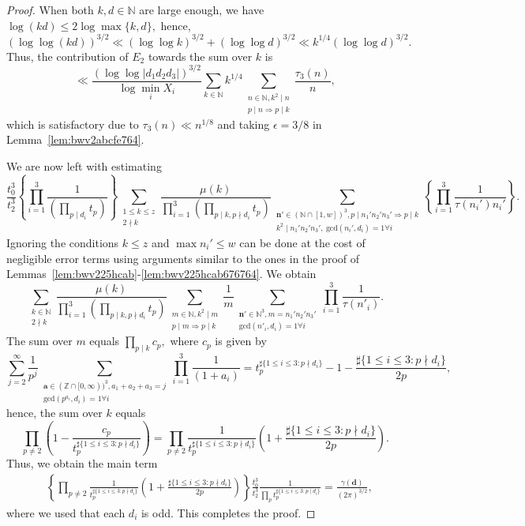 \documentclass[a4paper,12pt,reqno]{amsart}
\numberwithin{equation}{section} \numberwithin{figure}{section}
\newcommand\Z{\mathbb{Z}}
\newcommand\N{\mathbb{N}}
\renewcommand{\l}{\left}
\renewcommand{\r}{\right}
\renewcommand{\b}{\mathbf}
\renewcommand{\gcd}{\textrm{gcd}}
\renewcommand{\leq}{\leqslant}
\renewcommand{\#}{\sharp}
\theoremstyle{definition}
\numberwithin{lemma}{section}
\begin{document}
\begin{proof}
When both $k,d\in \N$ are 
 large enough,
we have  $ \log (k d) \leq 2\log \max\{k, d\},$ hence, $$(\log \log (k d) )^{3/2} \ll
(\log \log k)^{3/2}+(\log \log d)^{3/2}
\ll k^{1/4}
(\log \log d)^{3/2}
 .$$ Thus, 
the contribution of $E_2$ 
  towards the sum over $k$ is 
\[\ll 
\frac{(\log \log |d_1d_2d_3| )^{3/2} }{\log  \min_i X_i}
 \sum_{k\in \N }
k^{1/4} 
\sum_{\substack{ n\in \N, k^2 \mid n \\  p\mid n \Rightarrow p\mid k  }} \frac{\tau_3(n)   }{n} 
 ,\] which is satisfactory due to 
 $\tau_3(n) \ll n ^{1/8} $ and taking $\epsilon=3/8$ in 
Lemma~\ref{lem:bwv2abcfe764}. 



We are now  left with estimating
 \[ 
\frac{t_0^3}{t_2^3}
\l\{ \prod_{i=1}^3 
\frac{1}{ 
(\prod_{p\mid  d_i  } t_p)
 } \r\}\sum_{\substack{ 1\leq k \leq z  \\2\nmid k } }  
\frac{ \mu(k) 
 }{\prod_{i=1}^3\l(\prod_{p\mid k,p\nmid d_i}t_p\r)} 
\sum_{\substack{ \b n' \in (\N\cap[1,w])^3, p\mid n_1'n_2'n_3' \Rightarrow p\mid k \\
k^2\mid n_1'n_2'n_3' ,\ 
\gcd(n_i',d_i )=1 \forall i } } 
 \l\{\prod_{i=1}^3
\frac{1 }{ \tau( n_i') n_i'}  
\r\}
.\]
Ignoring the conditions $k\leq z $ and $\max n_i'\leq w $ can be done 
at the cost of negligible error terms using arguments similar to the ones 
in the proof of Lemmas~\ref{lem:bwv225hcab}-\ref{lem:bwv225hcab676764}.
We obtain  \[  \sum_{\substack{ k\in \N \\2\nmid k  }} 
\frac{\mu(k)}{\prod_{i=1}^3 \l( \prod_{p\mid k, p\nmid d_i }t_p\r) }
 \sum_{\substack{ m  \in \N , k^2\mid m    \\  p\mid m \Rightarrow p\mid k   } }
 \frac{1}{m } 
\sum_{\substack{ \b n' \in \N^3,  m=n_1'n_2'n_3' \\ \gcd(n'_i ,d_i )=1 \forall i
   } }   \prod_{i=1}^3    \frac{1 }{ \tau(n'_i)}.\]   
The   sum over $m$ equals $\prod_{p\mid k } c_p ,$ where $c_p$ is given by 
\[
 \sum_{j=2}^\infty \frac{1}{p^j } 
\sum_{\substack{
\b a \in (\Z\cap [0,\infty) )^3  , a_1+a_2+a_3=j
\\\gcd(p^{a_i}, d_i)=1  \forall i }
}   \prod_{i=1}^3 \frac{1}{(1+a_i) }
=
t_p^{\#\{1\leq i \leq 3: p\nmid d_i \}}
-1-\frac{\#\{1\leq i \leq 3: p\nmid d_i \}}{2p}
,\]  hence, the sum over $k$ equals $$ \prod_{p\neq 2  } \l(1-\frac{c_p}{t_p^{\#\{1\leq i \leq 3: p\nmid d_i \}}} \r)=
 \prod_{p\neq 2  } 
 \frac{1}{t_p^{\#\{1\leq i \leq 3: p\nmid d_i \}}}  
\l(1+  \frac{\#\{1\leq i  \leq 3 : p\nmid d_i \}}{2 p} \r). $$
Thus, we obtain  the main term 
\begin{align*}
&
\l\{ \prod_{p\neq 2  } 
 \frac{1}{t_p^{\#\{1\leq i \leq 3: p\nmid d_i \}}}  
\l(1+  \frac{\#\{1\leq i  \leq 3 : p\nmid d_i \}}{2 p} \r)\r\}
\frac{t_0^3}{t_2^3}
\frac{1}{\prod_{p} t_p^{\#\{1\leq i \leq 3: p\mid d_i \}}} 
= 
\frac{\gamma(\b d ) }{(2\pi )^{3/2} } 
,\end{align*}
where we used that each $d_i $ is odd.  This completes the proof.
\end{proof}  
\end{document}
